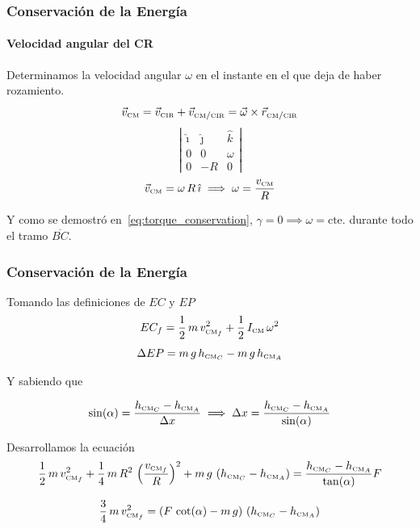 \documentclass[a4paper]{beamer}
\newcommand{\tcm}{\ensuremath\text{\tiny CM}}
\newcommand{\uveci}{\hat{\imath}}
\newcommand{\uvecj}{\hat{\jmath}}
\begin{document}
\begin{frame}
	\frametitle{Conservación de la Energía}
	\framesubtitle{Velocidad angular del CR}

	Determinamos la velocidad angular $\omega$ en el instante en el que deja de haber rozamiento.
	$$  \vec{v}_{\tcm} = \vec{v}_{\text{\tiny CIR}} + \vec{v}_{\tcm / \text{\tiny CIR}} = \vec{\omega} \times \vec{r}_{\tcm / \text{\tiny CIR}}$$
	$$\left| \begin{matrix}
			\uveci & \uvecj & \hat{k} \\
			0      & 0      & \omega  \\
			0      & -R     & 0
		\end{matrix}\right| $$
	$$ \vec{v}_\tcm = \omega\,R\, \uveci \implies \omega = \frac{v_\tcm}{R} $$

	Y como se demostró en~\eqref{eq:torque_conservation}, $\gamma = 0 \implies \omega = \text{cte.}$ durante todo el tramo $\overline{BC}$.


\end{frame}

\begin{frame}
	\frametitle{Conservación de la Energía}
	Tomando las definiciones de $EC$ y $EP$
	$$ EC_f = \frac{1}{2}\,m\,v_{\tcm_f}^2 + \frac{1}{2}\, I_\tcm \,\omega^2 $$
	$$\Delta EP = m\,g\,h_{\tcm_C} - m\,g\,h_{\tcm_A}  $$


	Y sabiendo que

	$$ \sin(\alpha) = \frac{h_{\tcm_C} - h_{\tcm_A}}{\Delta x} \implies \Delta x = \frac{h_{\tcm_C} - h_{\tcm_A}}{\sin(\alpha)}$$

	\vspace{1em}
	Desarrollamos la ecuación
	$$ \frac{1}{2}\,m\,v_{\tcm_f}^2 + \frac{1}{4}\,m\,R^2\,\left( \frac{v_{\tcm_f}}{R}\right)^2  + m\,g\,\left(h_{\tcm_C} - h_{\tcm_A} \right) = \frac{h_{\tcm_C} - h_{\tcm_A}}{\tan(\alpha)}F $$

	$$ \frac{3}{4}\,m\,v_{\tcm_f}^2 = (F\, \cot(\alpha) - m\,g)\,\left(h_{\tcm_C} - h_{\tcm_A} \right) $$

\end{frame}
\end{document}
